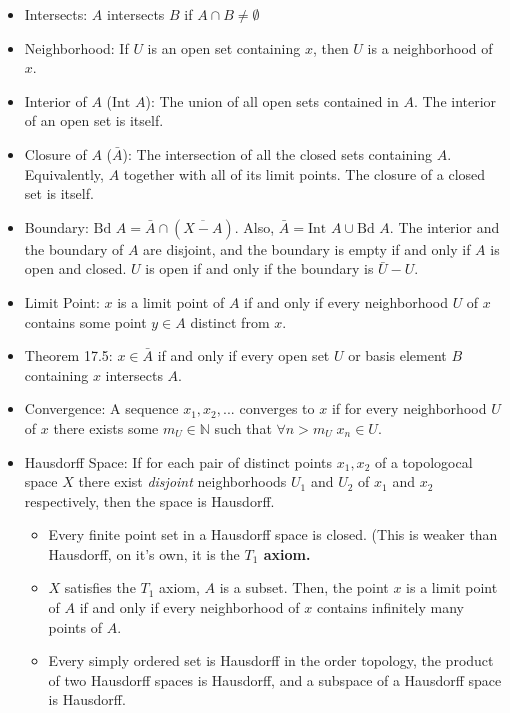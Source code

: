 \documentclass[12pt,letterpaper]{article}
\begin{document}
\begin{enumerate}
\begin{itemize}
    \item \label{dfn:intersects} Intersects: $A$ intersects $B$ if $A \cap B \neq \emptyset$
    \item \label{dfn:neighborhood} Neighborhood: If $U$ is an open set containing $x$, then $U$ is a neighborhood of $x$.
    \item \label{dfn:interior} Interior of $A$ ($\text{Int }A$): The union of all open sets contained in $A$. The interior of an open set is itself.
    \item \label{dfn:closure} Closure of $A$ ($\bar{A}$): The intersection of all the closed sets containing $A$. Equivalently, $A$ together with all of its limit points. The closure of a closed set is itself.
    \item \label{dfn:boundary} Boundary: $\text{Bd } A = \bar{A}\cap(\overline{X-A})$. Also, $\bar{A} = \text{Int } A \cup \text{Bd } A$. The interior and the boundary of $A$ are disjoint, and the boundary is empty if and only if $A$ is open and closed. $U$ is open if and only if the boundary is $\bar{U}-U$.
    \item \label{dfn:limitPoint} Limit Point: $x$ is a limit point of $A$ if and only if every neighborhood $U$ of $x$ contains some point $y\in A$ distinct from $x$.
    \item \label{thm:BelongsClosure17.5} Theorem 17.5:  $x\in \bar{A}$ if and only if every open set $U$ or basis element $B$ containing $x$ intersects $A$.
    \item \label{dfn:converge} Convergence: A sequence $x_1, x_2, ...$ converges to $x$ if for every neighborhood $U$ of $x$ there exists some $m_U\in\mathbb{N}$ such that $\forall n>m_U\; x_n\in U$.
    \item \label{dfn:Hausdorff} Hausdorff Space: If for each pair of distinct points $x_1,x_2$ of a topologocal space $X$ there exist \emph{disjoint} neighborhoods $U_1$ and $U_2$ of $x_1$ and $x_2$ respectively, then the space is Hausdorff.
    \begin{itemize}
      \item \label{thm:FinitePointHausdorff} Every finite point set in a Hausdorff space is closed. (This is weaker than Hausdorff, on it's own, it is the \textbf{$T_1$ axiom.}
      \item \label{thm:LimitPointT1} $X$ satisfies the $T_1$ axiom, $A$ is a subset. Then, the point $x$ is a limit point of $A$ if and only if every neighborhood of $x$ contains infinitely many points of $A$.
      \item \label{thm:inheritingHausdorff} Every simply ordered set is Hausdorff in the order topology, the product of two Hausdorff spaces is Hausdorff, and a subspace of a Hausdorff space is Hausdorff.

\end{itemize}
\end{itemize}
\end{enumerate}
\end{document}
